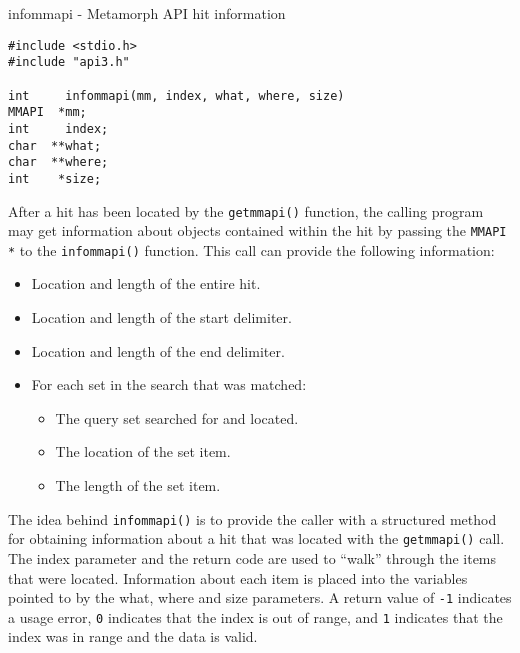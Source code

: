 \NAME
{infommapi - Metamorph API hit information}

\SYNOPSIS
\begin{verbatim}
#include <stdio.h>
#include "api3.h"

int     infommapi(mm, index, what, where, size)
MMAPI  *mm;
int     index;
char  **what;
char  **where;
int    *size;

\end{verbatim}

\DESCRIPTION

After a hit has been located by the \verb`getmmapi()` function, the
calling program may get information about objects contained within
the hit by passing the \verb`MMAPI *` to the \verb`infommapi()` function.  This
call can provide the following information:
\begin{itemize}
\item Location and length of the entire hit.
\item Location and length of the start delimiter.
\item Location and length of the end delimiter.
\item For each set in the search that was matched:
  \begin{itemize}
  \item The query set searched for and located.
  \item The location of the set item.
  \item The length of the set item.
  \end{itemize}
\end{itemize}

The idea behind \verb`infommapi()` is to provide the caller with a
structured method for obtaining information about a hit that was
located with the \verb`getmmapi()` call.  The index parameter and the
return code are used to ``walk'' through the items that were
located.  Information about each item is placed into the variables
pointed to by the what, where and size parameters.  A return value
of \verb`-1` indicates a usage error, \verb`0` indicates that the index is out
of range, and \verb`1` indicates that the index was in range and the data
is valid.

